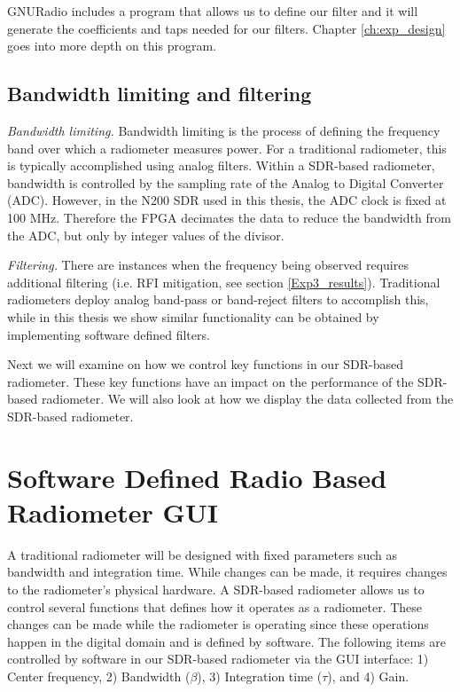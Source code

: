 

GNURadio includes a program that allows us to define our filter and it will generate the coefficients and taps needed for our filters.  Chapter \ref{ch:exp_design} goes into more depth on this program.

\subsection{Bandwidth limiting and filtering}

\emph{Bandwidth limiting.}  Bandwidth limiting is the process of defining the frequency band over which a radiometer measures power.  For a traditional radiometer, this is typically accomplished using analog filters.  Within a SDR-based radiometer, bandwidth is controlled by the sampling rate of the Analog to Digital Converter (ADC).  However, in the N200 SDR used in this thesis, the ADC clock is fixed at 100 MHz.  Therefore the FPGA decimates the data to reduce the bandwidth from the ADC, but only by integer values of the divisor.

\emph{Filtering.}  There are instances when the frequency being observed requires additional filtering (i.e. RFI mitigation, see section \ref{Exp3_results}).  Traditional radiometers deploy analog band-pass or band-reject filters to accomplish this, while in this thesis we show similar functionality can be obtained by implementing software defined filters.

Next we will examine on how we control key functions in our SDR-based radiometer.  These key functions have an impact on the performance of the SDR-based radiometer.  We will also look at how we display the data collected from the SDR-based radiometer.

\section{Software Defined Radio Based Radiometer GUI}

A traditional radiometer will be designed with fixed parameters such as bandwidth and integration time.  While changes can be made, it requires changes to the radiometer's physical hardware.  A SDR-based radiometer allows us to control several functions that defines how it operates as a radiometer.  These changes can be made while the radiometer is operating since these operations happen in the digital domain and is defined by software. The following items are controlled by software in our SDR-based radiometer via the GUI interface: 1) Center frequency, 2) Bandwidth ($\beta$), 3) Integration time ($\tau$), and 4) Gain.

